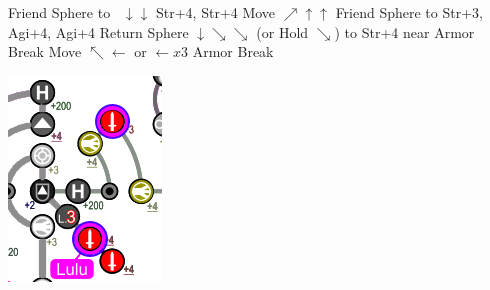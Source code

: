 \begin{spheregrid}
    \begin{itemize}
        \yunaf Friend Sphere to \lulu\ $\downarrow\downarrow$
        \yunaf Str+4, Str+4
        \luluf Move $\nearrow\uparrow\uparrow$
        \yunaf Friend Sphere to \lulu
        \yunaf Str+3, Agi+4, Agi+4
        \tidusf Return Sphere $\downarrow\searrow\searrow$ (or Hold $\searrow$) to Str+4 near Armor Break
        \tidusf Move $\nwarrow\leftarrow$ or $\leftarrow x3$
        \tidusf Armor Break
    \end{itemize}
    \includegraphics[width=.25\columnwidth]{graphics/2_and_2}
\end{spheregrid}
